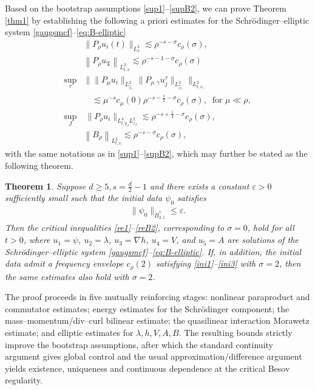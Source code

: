 \documentclass[11pt,letterpaper,reqno]{amsart}
\numberwithin{equation}{section}
\newtheorem{theorem}{Theorem}[section]
\theoremstyle{definition}
\theoremstyle{remark}
\begin{document}
Based on the bootstrap assumptions \eqref{sup1}--\eqref{supB2}, we can prove
Theorem \ref{thm1} by  establishing the following a priori estimates for the Schr\"odinger--elliptic system  \eqref{gaugsmcf}--\eqref{eq:B-elliptic}
\begin{align}
	&\|P_{\rho} u_i(t)\|_{L^2_x} \lesssim \rho^{-s-\sigma} c_\rho (\sigma),\label{re1}\\
	&\left\|P_{\rho }   u_{\mathfrak{T} }\right\|_{L^2_{t,x } }\lesssim  \rho^{-s-1-\sigma} c_\rho(\sigma) \label{reV}\\
\sup_{\tau} &\big\| \|P_\mu u_i\|_{L^2_{\widehat{x}_\gamma}}   \| P_{\rho,\gamma} u_j^\tau\|_{L^2_{\widehat{x}_\gamma}}  \big\|_{L^2_{t,x_\gamma}} \label{re2} \\
 &\quad \lesssim \mu^{-s} c_\mu(0)   \rho^{-s-\frac 12-\sigma} c_\rho(\sigma), ~	\text{ for } \mu\ll \rho,\nonumber\\
	 	\sup_J &\ \|  P_\rho u_i  \|_{L^4_{t,y_J}L^2_{z_J}} \lesssim  \rho^{-s+\frac 14-\sigma} c_\rho(\sigma), \label{re3}\\
&\left\|B_{\rho }\right\|_{L^2_{t,x } }\lesssim   \rho^{-s-\sigma} c_\rho(\sigma),\label{reB2}
\end{align}
with the same notations as in  \eqref{sup1}--\eqref{supB2}, which may further be stated as the following theorem.
\begin{theorem} \label{thm_a_apr}
		Suppose $ d\geq 5, s=\frac {d}{2}-1 $ and there exists a constant $ \varepsilon>0 $ sufficiently small such that the initial data $ \psi_0 $ satisfies
	\begin{align*}
		\| \psi_0\|_{\dot{B}_{2,1}^s} \leq \varepsilon.
	\end{align*}	
		Then the critical inequalities \eqref{re1}--\eqref{reB2}, corresponding
	to \(\sigma=0\), hold for all \(t>0\), where
	\(u_1=\psi\), \(u_2=\lambda\), \(u_3=\nabla h\), \(u_4=V\), and
	\(u_5=A\) are solutions of the Schr\"odinger--elliptic system
	\eqref{gaugsmcf}--\eqref{eq:B-elliptic}. If, in addition, the initial
	data admit a frequency envelope \(c_\rho(2)\) satisfying
	\eqref{ini1}--\eqref{ini3} with \(\sigma=2\), then the same estimates
	also hold with \(\sigma=2\).
\end{theorem}

The proof proceeds in five mutually reinforcing stages: nonlinear paraproduct and
commutator estimates; energy estimates for the Schr\"odinger component; the
mass--momentum/div--curl bilinear estimate; the quasilinear interaction Morawetz
estimate; and elliptic estimates for $\lambda,h,V,A,B$.  The resulting bounds
strictly improve the bootstrap assumptions, after which the standard continuity
argument gives global control and the usual approximation/difference argument
yields existence, uniqueness and continuous dependence at the critical Besov
regularity.
\end{document}
